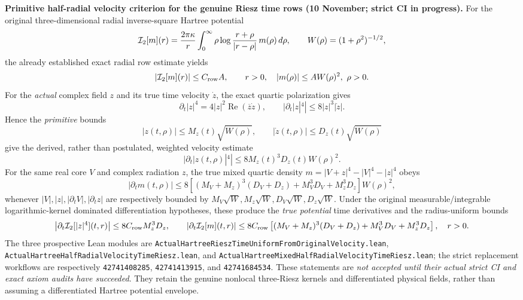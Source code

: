 \documentclass[11pt]{amsart}
\begin{document}
\medskip
\noindent\textbf{Primitive half-radial velocity criterion for the genuine Riesz time rows (10 November; strict CI in progress).}
For the original three-dimensional radial inverse-square Hartree potential
\[
 {\cal I}_2[m](r)=\frac{2\pi\kappa}{r}
 \int_0^\infty \rho\log\frac{r+\rho}{|r-\rho|}\,m(\rho)\,d\rho,
 \qquad W(\rho)=(1+\rho^2)^{-1/2},
\]
the already established exact radial row estimate yields
\[
 |{\cal I}_2[m](r)|\le C_{\rm row} A,\qquad r>0,
 \quad |m(\rho)|\le A W(\rho)^2,\ \rho>0.
\]
For the \emph{actual} complex field $z$ and its true time velocity $\dot z$,
the exact quartic polarization gives
\[
 \partial_t|z|^4=4|z|^2\operatorname{Re}(\overline z\dot z),
 \qquad |\partial_t|z|^4|\le8|z|^3|\dot z|.
\]
Hence the \emph{primitive} bounds
\[
 |z(t,\rho)|\le M_z(t)\sqrt{W(\rho)},\qquad
 |\dot z(t,\rho)|\le D_z(t)\sqrt{W(\rho)}
\]
give the derived, rather than postulated, weighted velocity estimate
\[
 |\partial_t|z(t,\rho)|^4|
 \le8M_z(t)^3D_z(t)W(\rho)^2.
\]
For the same real core $V$ and complex radiation $z$, the true mixed
quartic density $m=|V+z|^4-|V|^4-|z|^4$ obeys
\[
 |\partial_t m(t,\rho)|
 \le8\!\left[(M_V+M_z)^3(D_V+D_z)
             +M_V^3D_V+M_z^3D_z\right]W(\rho)^2,
\]
whenever $|V|,|z|,|\partial_tV|,|\partial_tz|$ are respectively bounded by
$M_V\sqrt W,M_z\sqrt W,D_V\sqrt W,D_z\sqrt W$.
Under the original measurable/integrable logarithmic-kernel dominated
differentiation hypotheses, these produce the \emph{true potential}
time derivatives and the radius-uniform bounds
\[
 \left|\partial_t{\cal I}_2[|z|^4](t,r)\right|
 \le8C_{\rm row}M_z^3D_z,\qquad
 \left|\partial_t{\cal I}_2[m](t,r)\right|
 \le8C_{\rm row}\left[(M_V+M_z)^3(D_V+D_z)
             +M_V^3D_V+M_z^3D_z\right],
 \quad r>0.
\]
The three prospective Lean modules are
\texttt{ActualHartreeRieszTimeUniformFromOriginalVelocity.lean},
\texttt{ActualHartreeHalfRadialVelocityTimeRiesz.lean}, and
\texttt{ActualHartreeMixedHalfRadialVelocityTimeRiesz.lean};
the strict replacement workflows are respectively
\texttt{42741408285}, \texttt{42741413915}, and \texttt{42741684534}.
These statements are \emph{not accepted until their actual strict CI
and exact axiom audits have succeeded}. They retain the genuine
nonlocal three-Riesz kernels and differentiated physical fields, rather
than assuming a differentiated Hartree potential envelope.
\end{document}
